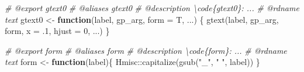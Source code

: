 \documentclass[
]{article}
\newenvironment{Shaded}{\begin{snugshade}}{\end{snugshade}}
\newcommand{\AttributeTok}[1]{\textcolor[rgb]{0.77,0.63,0.00}{#1}}
\newcommand{\CommentTok}[1]{\textcolor[rgb]{0.56,0.35,0.01}{\textit{#1}}}
\newcommand{\ControlFlowTok}[1]{\textcolor[rgb]{0.13,0.29,0.53}{\textbf{#1}}}
\newcommand{\DecValTok}[1]{\textcolor[rgb]{0.00,0.00,0.81}{#1}}
\newcommand{\FunctionTok}[1]{\textcolor[rgb]{0.00,0.00,0.00}{#1}}
\newcommand{\NormalTok}[1]{#1}
\newcommand{\OtherTok}[1]{\textcolor[rgb]{0.56,0.35,0.01}{#1}}
\newcommand{\SpecialCharTok}[1]{\textcolor[rgb]{0.00,0.00,0.00}{#1}}
\newcommand{\StringTok}[1]{\textcolor[rgb]{0.31,0.60,0.02}{#1}}
\begin{document}
\begin{Shaded}
\begin{Highlighting}[]
\CommentTok{\#\textquotesingle{} @export gtext0}
\CommentTok{\#\textquotesingle{} @aliases gtext0}
\CommentTok{\#\textquotesingle{} @description \textbackslash{}code\{gtext0\}: ...}
\CommentTok{\#\textquotesingle{} @rdname text}
\NormalTok{gtext0 }\OtherTok{\textless{}{-}} \ControlFlowTok{function}\NormalTok{(label, gp\_arg, }\AttributeTok{form =}\NormalTok{ T, ...) \{}
  \FunctionTok{gtext}\NormalTok{(label, gp\_arg, form, }\AttributeTok{x =}\NormalTok{ .}\DecValTok{1}\NormalTok{, }\AttributeTok{hjust =} \DecValTok{0}\NormalTok{, ...)}
\NormalTok{\}}

\CommentTok{\#\textquotesingle{} @export form}
\CommentTok{\#\textquotesingle{} @aliases form}
\CommentTok{\#\textquotesingle{} @description \textbackslash{}code\{form\}: ...}
\CommentTok{\#\textquotesingle{} @rdname text}
\NormalTok{form }\OtherTok{\textless{}{-}} \ControlFlowTok{function}\NormalTok{(label)\{}
\NormalTok{  Hmisc}\SpecialCharTok{::}\FunctionTok{capitalize}\NormalTok{(}\FunctionTok{gsub}\NormalTok{(}\StringTok{"\_"}\NormalTok{, }\StringTok{" "}\NormalTok{,  label))}
\NormalTok{\}}


\end{Highlighting}
\end{Shaded}
\end{document}
